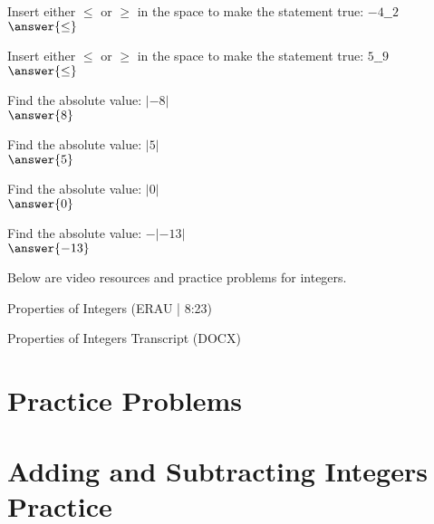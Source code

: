 \documentclass{ximera}
\begin{document}
\begin{problem}
Insert either $\leq$ or $\geq$ in the space to make the statement true: $-4\_\_2$\\
$\answer{\leq}$
\end{problem}

\begin{problem}
Insert either $\leq$ or $\geq$ in the space to make the statement true: $5\_\_9$\\
$\answer{\leq}$
\end{problem}



\begin{problem}
Find the absolute value: $|-8|$\\
$\answer{8}$
\end{problem}

\begin{problem}
Find the absolute value: $|5|$\\
$\answer{5}$
\end{problem}

\begin{problem}
Find the absolute value: $|0|$\\
$\answer{0}$
\end{problem}

\begin{problem}
Find the absolute value: $-|-13|$\\
$\answer{-13}$
\end{problem}


Below are video resources and practice problems for integers.

Properties of Integers (ERAU | 8:23)


Properties of Integers Transcript (DOCX)

\section*{Practice Problems}


\section*{Adding and Subtracting Integers Practice}
\end{document}
